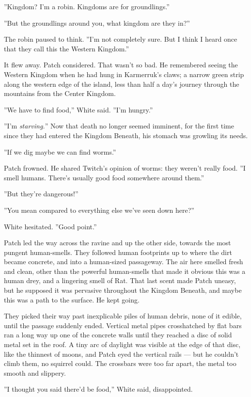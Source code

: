 \documentclass[12pt]{book}
\begin{document}
''Kingdom? I'm a robin. Kingdoms are for groundlings.''

''But the groundlings around you, what kingdom are they in?''

The robin paused to think. ''I'm not completely sure. But I think I heard once that they call this the Western Kingdom.''

It flew away. Patch considered. That wasn't so bad. He remembered seeing the Western Kingdom when he had hung in Karmerruk's claws; a narrow green strip along the western edge of the island, less than half a day's journey through the mountains from the Center Kingdom.

''We have to find food,'' White said. ''I'm hungry.''

''I'm {\it starving.}'' Now that death no longer seemed imminent, for the first time since they had entered the Kingdom Beneath, his stomach was growling its needs.

''If we dig maybe we can find worms.''

Patch frowned. He shared Twitch's opinion of worms: they weren't really food. ''I smell humans. There's usually good food somewhere around them.''

''But they're dangerous!''

''You mean compared to everything else we've seen down here?''

White hesitated. ''Good point.''

Patch led the way across the ravine and up the other side, towards the most pungent human-smells. They followed human footprints up to where the dirt became concrete, and into a human-sized passageway. The air here smelled fresh and clean, other than the powerful human-smells that made it obvious this was a human drey, and a lingering smell of Rat. That last scent made Patch uneasy, but he supposed it was pervasive throughout the Kingdom Beneath, and maybe this was a path to the surface. He kept going.

They picked their way past inexplicable piles of human debris, none of it edible, until the passage suddenly ended. Vertical metal pipes crosshatched by flat bars ran a long way up one of the concrete walls until they reached a disc of solid metal set in the roof. A tiny arc of daylight was visible at the edge of that disc, like the thinnest of moons, and Patch eyed the vertical rails ---
but he couldn't climb them, no squirrel could. The crossbars were too far apart, the metal too smooth and slippery.

''I thought you said there'd be food,'' White said, disappointed.
\end{document}
